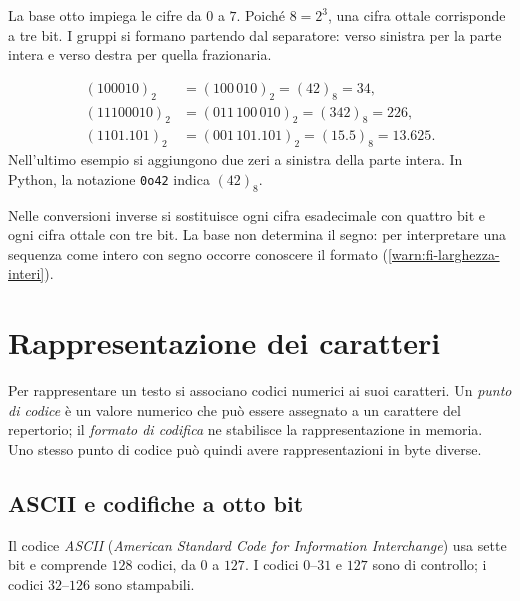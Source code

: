 La base otto impiega le cifre da \(0\) a \(7\). Poiché \(8=2^3\),
una cifra ottale corrisponde a tre bit. I gruppi si formano
partendo dal separatore: verso sinistra per la parte intera e verso
destra per quella frazionaria.

\clearpage

\begin{example}
\begin{align*}
  (100010)_2&=(100\,010)_2=(42)_8=34,\\
  (11100010)_2&=(011\,100\,010)_2=(342)_8=226,\\
  (1101.101)_2&=(001\,101.101)_2=(15.5)_8=13.625.
\end{align*}
Nell'ultimo esempio si aggiungono due zeri a sinistra della parte
intera. In Python, la notazione \texttt{0o42} indica
\((42)_8\).
\end{example}

Nelle conversioni inverse si sostituisce ogni cifra esadecimale con
quattro bit e ogni cifra ottale con tre bit. La base non determina
il segno: per interpretare una sequenza come intero con segno occorre
conoscere il formato (\cref{warn:fi-larghezza-interi}).

\section{Rappresentazione dei caratteri}
\label{sec:fi-caratteri}

Per rappresentare un testo si associano codici numerici ai suoi
caratteri. Un \emph{punto di codice} è un valore numerico che può
essere assegnato a un carattere del repertorio; il
\emph{formato di codifica} ne stabilisce la rappresentazione in
memoria. Uno stesso punto di codice può quindi avere
rappresentazioni in byte diverse.

\subsection{ASCII e codifiche a otto bit}

Il codice \emph{ASCII} (\emph{American Standard Code for Information
Interchange}) usa sette bit e comprende \(128\) codici, da \(0\) a
\(127\). I codici \(0\)--\(31\) e \(127\) sono di controllo;
i codici \(32\)--\(126\) sono stampabili.

